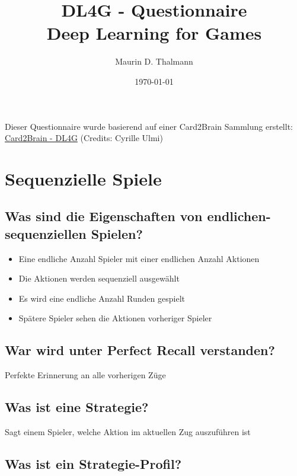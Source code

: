 \documentclass[a4paper]{article}
\title{\textbf{DL4G - Questionnaire} \\
Deep Learning for Games}
\date{\today}
\author{Maurin D. Thalmann}
\begin{document}
	
	\maketitle
	
	\begin{center}
		Dieser Questionnaire wurde basierend auf einer Card2Brain Sammlung erstellt:  \\
		\href{https://card2brain.ch/box/20190124_dl4g}{Card2Brain - DL4G} (Credits: Cyrille Ulmi)
	\end{center}
	
	\newpage
	\tableofcontents
	
	\newpage
	
	\section{Sequenzielle Spiele}
	
		\subsection{Was sind die Eigenschaften von endlichen-sequenziellen Spielen?}
		
		\begin{itemize}
			\item Eine endliche Anzahl Spieler mit einer endlichen Anzahl Aktionen
			\item Die Aktionen werden sequenziell ausgewählt
			\item Es wird eine endliche Anzahl Runden gespielt
			\item Spätere Spieler sehen die Aktionen vorheriger Spieler
		\end{itemize}
	
		\subsection{War wird unter Perfect Recall verstanden?}
		
		Perfekte Erinnerung an alle vorherigen Züge
		
		\subsection{Was ist eine Strategie?}
		
		Sagt einem Spieler, welche Aktion im aktuellen Zug auszuführen ist
		
		\subsection{Was ist ein Strategie-Profil?}
		
\end{document}
